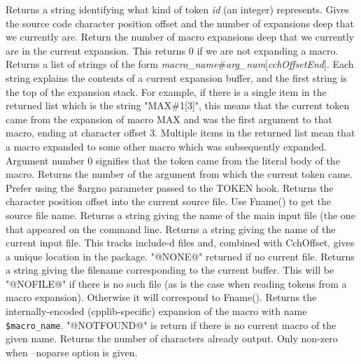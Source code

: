Returns a string identifying what kind of token \textit{id} (an integer) represents.
 Gives the source code character position offset and the number of expansions
 deep that we currently are.
 Return the number of macro expansions deep that we currently are in
 the current expansion.  This returns 0 if we are not expanding a macro.
 Returns a list of strings of the form 
 \textit{macro\_\-name}\#\textit{arg\_\-num}[\textit{cchOffsetEnd}]. 
 Each string explains the contents of a current expansion buffer,
 and the first string is the top of the expansion stack.
 For example, if there is a single item in the returned list
 which is the string "MAX\#1[3]", this means that the current
 token came from the expansion of macro MAX and was the first argument
 to that macro, ending at character offset 3.  Multiple items
 in the returned list mean that a macro expanded to some other
 macro which was subsequently expanded.  Argument number 0 signifies
 that the token came from the literal body of the macro.
 Returns the number of the argument from which the current token came.
 Prefer using the \$argno parameter passed to the TOKEN hook.
 Returns the character position offset into the current source file.
 Use Fname() to get the source file name.
 Returns a string giving the name of the main input file (the one
 that appeared on the command line.
 Returns a string giving the name of the current input file.  This
 tracks include-d files and, combined with CchOffset, gives a
 unique location in the package.  "@NONE@" returned if no current file.
 Returns a string giving the filename corresponding to the current
 buffer.  This will be "@NOFILE@" if there is no such file (as is
 the case when reading tokens from a macro expansion).
 Otherwise it will correspond to Fname().
 Returns the internally-encoded (cpplib-specific) expansion of
 the macro with name \texttt{\$macro\_\-name}.
 "@NOTFOUND@" is return if there is no current macro of the given name.
 Returns the number of characters already output.  Only non-zero when 
 --noparse option is given.
